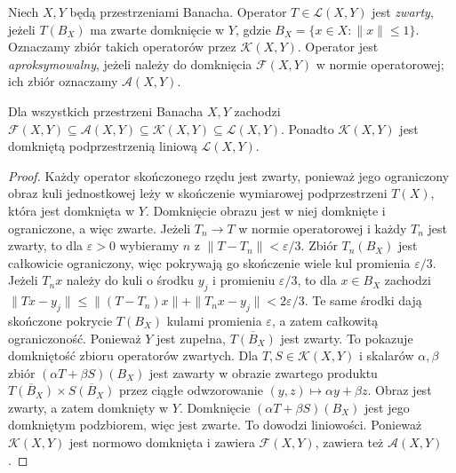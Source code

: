 \begin{definicja}
\label{def:compact-approximable28}
Niech $X,Y$ będą przestrzeniami Banacha.
Operator $T\in\mathcal L(X,Y)$ jest \emph{zwarty},
jeżeli $T(B_X)$ ma zwarte domknięcie w $Y$, gdzie
$B_X=\{x\in X:\|x\|\le1\}$.
Oznaczamy zbiór takich operatorów przez
$\mathcal K(X,Y)$. Operator jest \emph{aproksymowalny},
jeżeli należy do domknięcia $\mathcal F(X,Y)$
w normie operatorowej; ich zbiór oznaczamy
$\mathcal A(X,Y)$.
\end{definicja}

\begin{twierdzenie}
\label{thm:approximable-compact28}
Dla wszystkich przestrzeni Banacha $X,Y$ zachodzi
$\mathcal F(X,Y)\subseteq\mathcal A(X,Y)\subseteq
\mathcal K(X,Y)\subseteq\mathcal L(X,Y)$.
Ponadto $\mathcal K(X,Y)$ jest domkniętą podprzestrzenią
liniową $\mathcal L(X,Y)$.
\end{twierdzenie}
\begin{proof}
Każdy operator skończonego rzędu jest zwarty, ponieważ
jego ograniczony obraz kuli jednostkowej leży w skończenie
wymiarowej podprzestrzeni $T(X)$, która jest domknięta w $Y$.
Domknięcie obrazu jest w niej domknięte i ograniczone,
a więc zwarte.
Jeżeli $T_n\to T$ w normie operatorowej i każdy $T_n$
jest zwarty, to dla $\varepsilon>0$ wybieramy $n$ z
$\|T-T_n\|<\varepsilon/3$. Zbiór $T_n(B_X)$ jest
całkowicie ograniczony, więc pokrywają go skończenie
wiele kul promienia $\varepsilon/3$.
Jeżeli $T_nx$ należy do kuli o środku $y_j$ i promieniu
$\varepsilon/3$, to dla $x\in B_X$ zachodzi
$\|Tx-y_j\|\le\|(T-T_n)x\|+\|T_nx-y_j\|<2\varepsilon/3$.
Te same środki dają skończone pokrycie $T(B_X)$ kulami
promienia $\varepsilon$, a zatem całkowitą ograniczoność.
Ponieważ $Y$ jest zupełna, $\overline{T(B_X)}$ jest zwarty.
To pokazuje domkniętość zbioru operatorów zwartych.
Dla $T,S\in\mathcal K(X,Y)$ i skalarów $\alpha,\beta$
zbiór $(\alpha T+\beta S)(B_X)$ jest zawarty w obrazie
zwartego produktu $\overline{T(B_X)}\times\overline{S(B_X)}$
przez ciągłe odwzorowanie $(y,z)\mapsto\alpha y+\beta z$.
Obraz jest zwarty, a zatem domknięty w $Y$.
Domknięcie $(\alpha T+\beta S)(B_X)$ jest jego domkniętym
podzbiorem, więc jest zwarte. To dowodzi liniowości.
Ponieważ $\mathcal K(X,Y)$ jest normowo domknięta i zawiera
$\mathcal F(X,Y)$, zawiera też $\mathcal A(X,Y)$.
\end{proof}

